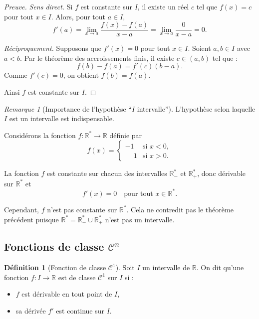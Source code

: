 \documentclass{report} %
\theoremstyle{definition}  %
\newtheorem{definition}{Définition}[chapter] %
\theoremstyle{plain} %
\theoremstyle{remark} %
\newtheorem*{remark}{Remarque} %
\begin{document}
\medskip

\begin{proof}[Preuve]
\emph{Sens direct.}  
Si \(f\) est constante sur \(I\), il existe un réel \(c\) tel que \(f(x) = c\) pour tout \(x \in I\).  
Alors, pour tout \(a \in I\),
\[
f'(a) = \lim_{x \to a} \frac{f(x)-f(a)}{x-a} = \lim_{x \to a} \frac{0}{x-a} = 0.
\]

\medskip
\emph{Réciproquement.}  
Supposons que \(f'(x) = 0\) pour tout \(x \in I\).  
Soient \(a,b \in I\) avec \(a<b\).  
Par le théorème des accroissements finis, il existe \(c \in (a,b)\) tel que :
\[
f(b) - f(a) = f'(c)(b-a).
\]
Comme \(f'(c) = 0\), on obtient \(f(b) = f(a)\).

Ainsi \(f\) est constante sur \(I\).
\end{proof}
\medskip
\begin{remark}[Importance de l'hypothèse ``\(I\) intervalle'']
L'hypothèse selon laquelle \(I\) est un intervalle est indispensable.

Considérons la fonction \(f : \mathbb{R}^* \to \mathbb{R}\) définie par
\[
f(x)=
\begin{cases}
-1 & \text{si } x<0,\\
\phantom{-}1 & \text{si } x>0.
\end{cases}
\]

La fonction \(f\) est constante sur chacun des intervalles
\(\mathbb{R}^*_-\) et \(\mathbb{R}^*_+\), donc dérivable sur \(\mathbb{R}^*\) et
\[
f'(x)=0 \quad \text{pour tout } x\in\mathbb{R}^*.
\]

Cependant, \(f\) n'est pas constante sur \(\mathbb{R}^*\).
Cela ne contredit pas le théorème précédent puisque
\(\mathbb{R}^*=\mathbb{R}^*_-\cup\mathbb{R}^*_+\) n'est pas un intervalle.
\end{remark}

\medskip
\subsection{Fonctions de classe \(\mathcal{C}^n\)}

\begin{definition}[Fonction de classe \(\mathcal{C}^1\)]
Soit \(I\) un intervalle de \(\mathbb{R}\).
On dit qu'une fonction \(f : I \to \mathbb{R}\) est de classe \(\mathcal{C}^1\) sur \(I\) si :
\begin{itemize}
    \item \(f\) est dérivable en tout point de \(I\),
    \item sa dérivée \(f'\) est continue sur \(I\).
\end{itemize}
\end{definition}
\end{document}
